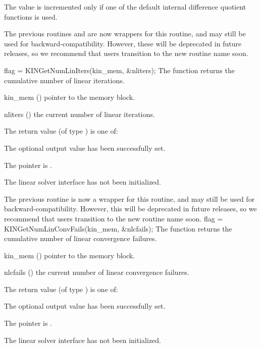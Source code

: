 {
  The value  is incremented only if one of the default
  internal difference quotient functions is used.

  The previous routines  and
   are now wrappers for this routine, and may
  still be used for backward-compatibility.  However, these will be
  deprecated in future releases, so we recommend that users transition
  to the new routine name soon.
}
{
  flag = KINGetNumLinIters(kin\_mem, \&nliters);
}
{
  The function  returns the
  cumulative number of linear iterations.
}
{
  \begin{args}
  \item[kin\_mem] ()
    pointer to the {\kinsol} memory block.
  \item[nliters] ()
    the current number of linear iterations.
  \end{args}
}
{
  The return value  (of type ) is one of:
  \begin{args}
  \item[\Id{KINLS\_SUCCESS}]
    The optional output value has been successfully set.
  \item[\Id{KINLS\_MEM\_NULL}]
    The  pointer is .
  \item[\Id{KINLS\_LMEM\_NULL}]
    The {\kinls} linear solver interface has not been initialized.
  \end{args}
}
{
  The previous routine  is now a wrapper for
  this routine, and may still be used for backward-compatibility.
  However, this will be deprecated in future releases, so we recommend
  that users transition to the new routine name soon.
}
{
  flag = KINGetNumLinConvFails(kin\_mem, \&nlcfails);
}
{
  The function  returns the
  cumulative number of linear convergence failures.
}
{
  \begin{args}
  \item[kin\_mem] ()
    pointer to the {\kinsol} memory block.
  \item[nlcfails] ()
    the current number of linear convergence failures.
  \end{args}
}
{
  The return value  (of type ) is one of:
  \begin{args}
  \item[\Id{KINLS\_SUCCESS}]
    The optional output value has been successfully set.
  \item[\Id{KINLS\_MEM\_NULL}]
    The  pointer is .
  \item[\Id{KINLS\_LMEM\_NULL}]
    The {\kinls} linear solver interface has not been initialized.
  \end{args}
}
